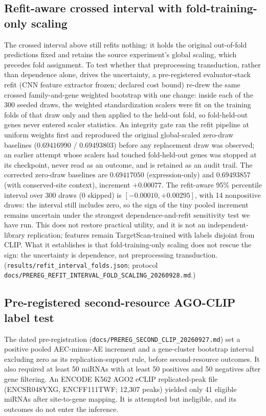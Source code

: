 \documentclass[11pt]{article}
\begin{document}
\subsection{Refit-aware crossed interval with fold-training-only scaling}
The crossed interval above still refits nothing: it holds the original
out-of-fold predictions fixed and retains the source experiment's global
scaling, which precedes fold assignment. To test whether that preprocessing
transduction, rather than dependence alone, drives the uncertainty, a
pre-registered evaluator-stack refit (CNN feature extractor frozen; declared
cost bound) re-drew the same crossed family-and-gene weighted bootstrap with
one change: inside each of the 300 seeded draws, the weighted standardization
scalers were fit on the training folds of that draw only and then applied to
the held-out fold, so fold-held-out genes never entered scaler statistics.
An integrity gate ran the refit pipeline at uniform weights first and
reproduced the original global-scaled zero-draw baselines
($0.69416990$ / $0.69493803$) before any replacement draw was observed; an
earlier attempt whose scalers had touched fold-held-out genes was stopped at
its checkpoint, never read as an outcome, and is retained as an audit trail.
The corrected zero-draw baselines are $0.69417050$ (expression-only) and
$0.69493857$ (with conserved-site context), increment $+0.00077$. The
refit-aware 95\% percentile interval over 300 draws (0 skipped) is
$[-0.00010,+0.00295]$, with 14 nonpositive draws: the interval still
includes zero, so the sign of the tiny pooled increment remains uncertain
under the strongest dependence-and-refit sensitivity test we have run. This
does not restore practical utility, and it is not an independent-library
replication; features remain TargetScan-trained with labels disjoint from
CLIP. What it establishes is that fold-training-only scaling does not rescue
the sign: the uncertainty is dependence, not preprocessing transduction.
(\texttt{results/refit\_interval\_folds.json}; protocol
\texttt{docs/PREREG\_REFIT\_INTERVAL\_FOLD\_SCALING\_20260928.md}.)
\subsection{Pre-registered second-resource AGO-CLIP label test}
The dated pre-registration (\texttt{docs/PREREG\_SECOND\_CLIP\_20260927.md})
set a positive pooled AEC-minus-AE increment and a gene-cluster bootstrap
interval excluding zero as its replication-support rule, before second-resource
outcomes. It also required at least 50 miRNAs with at least 50 positives and
50 negatives after gene filtering. An ENCODE K562 AGO2 eCLIP replicated-peak
file (ENCSR048YXG, ENCFF111TWF; 12{,}307 peaks) yielded only 41 eligible
miRNAs after site-to-gene mapping. It is attempted but ineligible, and its
outcomes do not enter the inference.
\end{document}
